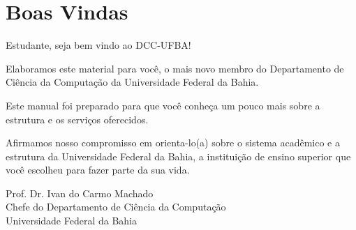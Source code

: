 \chapter{Boas Vindas}

Estudante, seja bem vindo ao DCC-UFBA!

Elaboramos este material para você, o mais novo membro do Departamento de Ciência da Computação da Universidade Federal da Bahia. 

Este manual foi preparado para que você conheça um pouco mais sobre a estrutura e os serviços oferecidos.

Afirmamos nosso compromisso em orienta-lo(a) sobre o sistema acadêmico e a estrutura da Universidade Federal da Bahia, a instituição de ensino superior que você escolheu para fazer parte da sua vida.

\vspace{1cm}

\hspace*{\fill}Prof. Dr. Ivan  do Carmo Machado  \\
\hspace*{\fill} Chefe do Departamento de Ciência da Computação \\
\hspace*{\fill}Universidade Federal da Bahia




